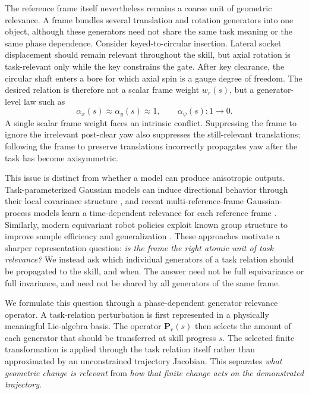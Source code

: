 \documentclass[letterpaper,10pt,conference]{ieeeconf}
\begin{document}
The reference frame itself nevertheless remains a coarse unit of geometric
relevance. A frame bundles several translation and rotation generators into one
object, although these generators need not share the same task meaning or the
same phase dependence. Consider keyed-to-circular insertion. Lateral socket
displacement should remain relevant throughout the skill, but axial rotation is
task-relevant only while the key constrains the gate. After key clearance, the
circular shaft enters a bore for which axial spin is a gauge degree of freedom.
The desired relation is therefore not a scalar frame weight $w_r(s)$, but a
generator-level law such as
\[
    \alpha_x(s)\approx \alpha_y(s)\approx 1,\qquad
    \alpha_\psi(s): 1 \rightarrow 0 .
\]
A single scalar frame weight faces an intrinsic conflict. Suppressing the frame
to ignore the irrelevant post-clear yaw also suppresses the still-relevant
translations; following the frame to preserve translations incorrectly
propagates yaw after the task has become axisymmetric.

This issue is distinct from whether a model can produce anisotropic outputs.
Task-parameterized Gaussian models can induce directional behavior through
their local covariance structure \cite{Calinon2014TPGMM,Calinon2018TPModels},
and recent multi-reference-frame Gaussian-process models learn a
time-dependent relevance for each reference frame \cite{Montero2024TPGP}.
Similarly, modern equivariant robot policies exploit known group structure to
improve sample efficiency and generalization
\cite{Cohen2016GECNN,Simeonov2022NDF,Ryu2024DiffusionEDF,Yang2024EquiBot,
Gao2024RiEMann}. These approaches motivate a sharper representation question:
\emph{is the frame the right atomic unit of task relevance?} We instead ask
which individual generators of a task relation should be propagated to the
skill, and when. The answer need not be full equivariance or full invariance,
and need not be shared by all generators of the same frame.

We formulate this question through a phase-dependent generator relevance
operator. A task-relation perturbation is first represented in a physically
meaningful Lie-algebra basis. The operator
$\mathbf P_r(s)$ then selects the amount of each generator that should be
transferred at skill progress $s$. The selected finite transformation is applied
through the task relation itself rather than approximated by an unconstrained
trajectory Jacobian. This separates \emph{what geometric change is relevant}
from \emph{how that finite change acts on the demonstrated trajectory}.
\end{document}
